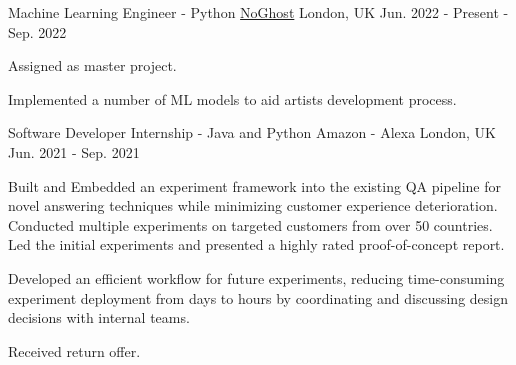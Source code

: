 

\begin{cventries}
  \cventry
  {Machine Learning Engineer - Python} %
  {\href{https://www.noghost.co.uk/}{NoGhost}} %
  {London, UK} %
  {Jun. 2022 - Present - Sep. 2022} %
  {
    \begin{cvitems} %
      \item {Assigned as master project.}
      \item {Implemented a number of ML models to aid artists development process.}
    \end{cvitems}
  }

  \cventry
    {Software Developer Internship - Java and Python} %
    {Amazon - Alexa} %
    {London, UK} %
    {Jun. 2021 - Sep. 2021} %
    {
      \begin{cvitems} %
        \item {Built and Embedded an experiment framework into the existing QA pipeline for novel answering techniques while minimizing customer experience deterioration. Conducted multiple experiments on targeted customers from over 50 countries. Led the initial experiments and presented a highly rated proof-of-concept report.}
        \item {Developed an efficient workflow for future experiments, reducing time-consuming experiment deployment from days to hours by coordinating and discussing design decisions with internal teams.}
        \item {Received return offer.}
      \end{cvitems}
    }


\end{cventries}
